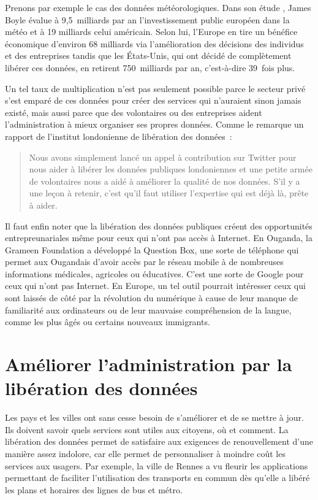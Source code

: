 Prenons par exemple le cas des données météorologiques. Dans son étude , James Boyle évalue à 9,5 milliards par an l'investissement public européen dans la météo et à 19 milliards celui américain. Selon lui, l'Europe en tire un bénéfice économique d'environ 68 milliards via l'amélioration des décisions des individus et des entreprises tandis que les États-Unis, qui ont décidé de complètement libérer ces données, en retirent 750 milliards par an, c'est-à-dire 39 fois plus.

Un tel taux de multiplication n'est pas seulement possible parce le secteur privé s'est emparé de ces données pour créer des services qui n'auraient sinon jamais existé, mais aussi parce que des volontaires ou des entreprises aident l'administration à mieux organiser ses propres données. Comme le remarque un rapport de l'institut londonienne de libération des données~: 

\begin{quotation}
Nous avons simplement lancé un appel à contribution sur Twitter pour nous aider à libérer les données publiques londoniennes et une petite armée de volontaires nous a aidé à améliorer la qualité de nos données. S'il y a une leçon à retenir, c'est qu'il faut utiliser l'expertise qui est déjà là, prête à aider.
\end{quotation}

Il faut enfin noter que la libération des données publiques créent des opportunités entrepreunariales même pour ceux qui n'ont pas accès à Internet. En Ouganda, la Grameen Foundation a développé la Question Box, une sorte de téléphone qui permet aux Ougandais d'avoir accès par le réseau mobile à de nombreuses informations médicales, agricoles ou éducatives. C'est une sorte de Google pour ceux qui n'ont pas Internet. En Europe, un tel outil pourrait intéresser ceux qui sont laissés de côté par la révolution du numérique à cause de leur manque de familiarité aux ordinateurs ou de leur mauvaise compréhension de la langue, comme les plus âgés ou certains nouveaux immigrants.  

\section{Améliorer l'administration par la libération des données}

Les pays et les villes ont sans cesse besoin de s'améliorer et de se mettre à jour. Ils doivent savoir quels services sont utiles aux citoyens, où et comment. La libération des données permet de satisfaire aux exigences de renouvellement d'une manière assez indolore, car elle permet de personnaliser à moindre coût les services aux usagers. Par exemple, la ville de Rennes a vu fleurir les applications permettant de faciliter l'utilisation des transports en commun dès qu'elle a libéré les plans et horaires des lignes de bus et métro.

